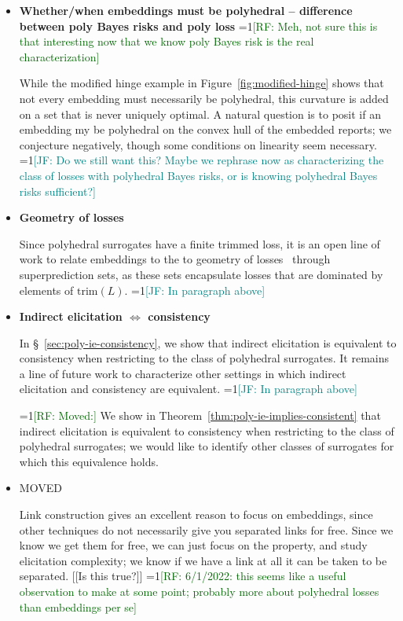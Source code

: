 \documentclass[11pt]{article}
\newcommand{\Comments}{1}
\newcommand{\mynote}[2]{\ifnum\Comments=1\textcolor{#1}{#2}\fi}
\newcommand{\raf}[1]{\mynote{darkgreen}{[RF: #1]}}
\newcommand{\jessie}[1]{\mynote{teal}{[JF: #1]}}
\newcommand{\trim}{\mathrm{trim}}
\begin{document}
\begin{itemize}\small
\setlength \itemsep{0.1em}
\item
  \textbf{Whether/when embeddings must be polyhedral -- difference between poly Bayes risks and poly loss} \raf{Meh, not sure this is that interesting now that we know poly Bayes risk is the real characterization}
  
While the modified hinge example in Figure~\ref{fig:modified-hinge} shows that not every embedding must necessarily be polyhedral, this curvature is added on a set that is never uniquely optimal.
A natural question is to posit if an embedding my be polyhedral on the convex hull of the embedded reports; we conjecture negatively, though some conditions on linearity seem necessary.
\jessie{Do we still want this?  Maybe we rephrase now as characterizing the class of losses with polyhedral Bayes risks, or is knowing polyhedral Bayes risks sufficient?}


\item
  \textbf{Geometry of losses}
  
 Since polyhedral surrogates have a finite trimmed loss, it is an open line of work to relate embeddings to the to geometry of losses~\citep{williamson2014geometry} through superprediction sets, as these sets encapsulate losses that are dominated by elements of $\trim(L)$. \jessie{In paragraph above}
 
\item
  \textbf{Indirect elicitation $\iff$ consistency}

  In \S~\ref{sec:poly-ie-consistency}, we show that indirect elicitation is equivalent to consistency when restricting to the class of polyhedral surrogates.
 It remains a line of future work to characterize other settings in which indirect elicitation and consistency are equivalent. \jessie{In paragraph above}

\raf{Moved:} We show in Theorem~\ref{thm:poly-ie-implies-consistent} that indirect elicitation is equivalent to consistency when restricting to the class of polyhedral surrogates; we would like to identify other classes of surrogates for which this equivalence holds.

 

\item MOVED
  
  Link construction gives an excellent reason to focus on embeddings, since other techniques do not necessarily give you separated links for free.  Since we know we get them for free, we can just focus on the property, and study elicitation complexity; we know if we have a link at all it can be taken to be separated.  [[Is this true?]]
  \raf{6/1/2022: this seems like a useful observation to make at some point; probably more about polyhedral losses than embeddings per se}




\end{itemize}
\end{document}
